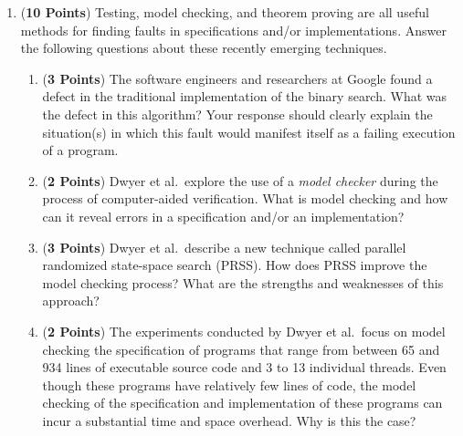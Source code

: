 \documentclass[12pt,epsf,psfig,graphics]{article}
\begin{document}
\begin{enumerate}
\begin{enumerate}
       \end{enumerate}
        
\newpage

\item ({\bf 10 Points}) Testing, model checking, and theorem proving
  are all useful methods for finding faults in specifications and/or
  implementations.  Answer the following questions about these
  recently emerging techniques.

  \begin{enumerate}
          
  \item ({\bf 3 Points}) The software engineers and researchers at
    Google found a defect in the traditional implementation of the
    binary search.  What was the defect in this algorithm?  Your
    response should clearly explain the situation(s) in which this
    fault would manifest itself as a failing execution of a program.

  \item ({\bf 2 Points}) Dwyer et al.\ explore the use of a {\em model
    checker} during the process of computer-aided verification.  What
    is model checking and how can it reveal errors in a specification
    and/or an implementation?

  \item ({\bf 3 Points}) Dwyer et al.\ describe a new technique called
    parallel randomized state-space search (PRSS). How does PRSS
    improve the model checking process?  What are the strengths and
    weaknesses of this approach?

    \item ({\bf 2 Points}) The experiments conducted by Dwyer et
     al.\ focus on model checking the specification of programs that
      range from between 65 and 934 lines of executable source code
      and 3 to 13 individual threads.  Even though these programs have
      relatively few lines of code, the model checking of the
      specification and implementation of these programs can incur a
      substantial time and space overhead.  Why is this the case?

  \end{enumerate}

\end{enumerate}
\end{document}
